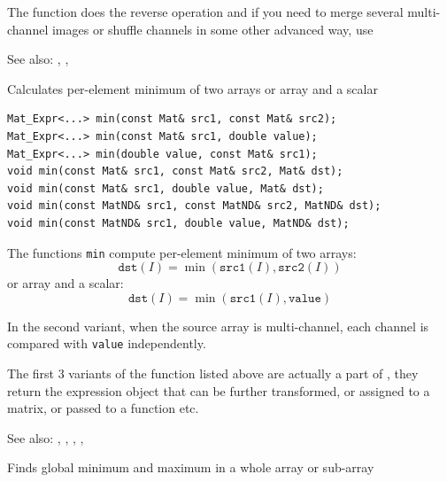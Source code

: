The function  does the reverse operation and if you need to merge several multi-channel images or shuffle channels in some other advanced way, use 

See also: , , 

\label{min}
Calculates per-element minimum of two arrays or array and a scalar

\begin{lstlisting}
Mat_Expr<...> min(const Mat& src1, const Mat& src2);
Mat_Expr<...> min(const Mat& src1, double value);
Mat_Expr<...> min(double value, const Mat& src1);
void min(const Mat& src1, const Mat& src2, Mat& dst);
void min(const Mat& src1, double value, Mat& dst);
void min(const MatND& src1, const MatND& src2, MatND& dst);
void min(const MatND& src1, double value, MatND& dst);
\end{lstlisting}
\begin{description}
\end{description}

The functions \texttt{min} compute per-element minimum of two arrays:
\[\texttt{dst}(I)=\min(\texttt{src1}(I), \texttt{src2}(I))\]
or array and a scalar:
\[\texttt{dst}(I)=\min(\texttt{src1}(I), \texttt{value})\]

In the second variant, when the source array is multi-channel, each channel is compared with \texttt{value} independently.

The first 3 variants of the function listed above are actually a part of , they return the expression object that can be further transformed, or assigned to a matrix, or passed to a function etc.

See also: , , , , 

\label{minMaxLoc}
Finds global minimum and maximum in a whole array or sub-array

